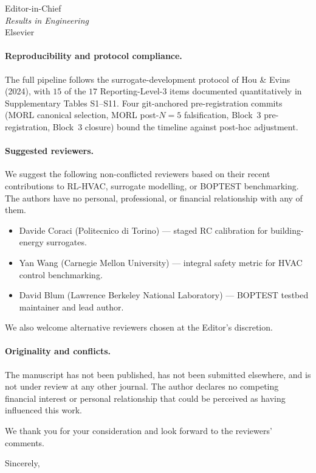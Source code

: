\documentclass[11pt,a4paper]{letter}
\begin{document}
\begin{letter}{Editor-in-Chief \\
               \textit{Results in Engineering} \\
               Elsevier}
\paragraph{Reproducibility and protocol compliance.}
The full pipeline follows the surrogate-development protocol of
Hou \& Evins (2024), with $15$ of the $17$ Reporting-Level-3 items
documented quantitatively in Supplementary Tables S1--S11. Four
git-anchored pre-registration commits (MORL canonical selection,
MORL post-$N{=}5$ falsification, Block~3 pre-registration, Block~3
closure) bound the timeline against post-hoc adjustment.

\paragraph{Suggested reviewers.}
We suggest the following non-conflicted reviewers based on their
recent contributions to RL-HVAC, surrogate modelling, or BOPTEST
benchmarking. The authors have no personal, professional, or
financial relationship with any of them.
\begin{itemize}
  \item Davide Coraci (Politecnico di Torino) --- staged RC
        calibration for building-energy surrogates.
  \item Yan Wang (Carnegie Mellon University) --- integral safety
        metric for HVAC control benchmarking.
  \item David Blum (Lawrence Berkeley National Laboratory) ---
        BOPTEST testbed maintainer and lead author.
\end{itemize}
We also welcome alternative reviewers chosen at the Editor's
discretion.

\paragraph{Originality and conflicts.}
The manuscript has not been published, has not been submitted
elsewhere, and is not under review at any other journal. The author
declares no competing financial interest or personal relationship
that could be perceived as having influenced this work.

We thank you for your consideration and look forward to the reviewers'
comments.

\closing{Sincerely,}

\end{letter}
\end{document}
